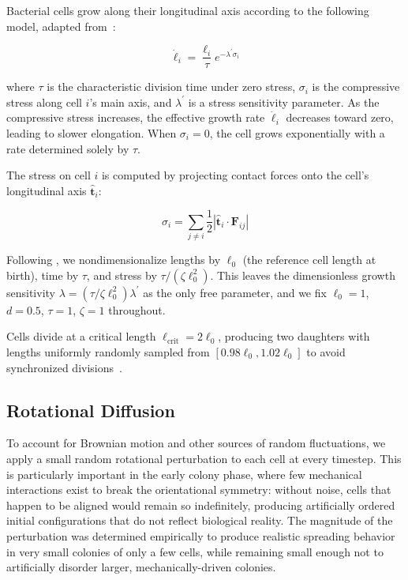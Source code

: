 \documentclass[a4paper,fleqn]{cas-dc}
\begin{document}
Bacterial cells grow along their longitudinal axis according to the following model, adapted from~\cite{Weady2024SM}:

\begin{equation} \label{eq:growth}
    \dot{\ell}_i = \frac{\ell_i}{\tau} e^{-\lambda^{'} \sigma_i}
\end{equation}

where $\tau$ is the characteristic division time under zero stress, $\sigma_i$ is the compressive stress along cell $i$'s main axis, and $\lambda^{'}$ is a stress sensitivity parameter. As the compressive stress increases, the effective growth rate $\dot{\ell}_i$ decreases toward zero, leading to slower elongation. When $\sigma_i = 0$, the cell grows exponentially with a rate determined solely by $\tau$.

The stress on cell $i$ is computed by projecting contact forces onto the cell's longitudinal axis $\hat{\mathbf{t}}_i$:

\begin{equation} \label{eq:stress}
    \sigma_i = \sum_{j \neq i} \frac{1}{2} \left| \hat{\mathbf{t}}_i \cdot \mathbf{F}_{ij} \right|
\end{equation}

Following \cite{Weady2024SM}, we nondimensionalize lengths by $\ell_0$ (the reference cell length at birth), time by $\tau$, and stress by $\tau / (\zeta \ell_0^2)$. This leaves the dimensionless growth sensitivity $\lambda = (\tau / \zeta \ell_0^2)\lambda^{'}$ as the only free parameter, and we fix $\ell_0 = 1$, $d = 0.5$, $\tau = 1$, $\zeta = 1$ throughout.

Cells divide at a critical length $\ell_{\text{crit}} = 2 \ell_0$, producing two daughters with lengths uniformly randomly sampled from $\left[0.98 \ell_0, 1.02 \ell_0 \right]$ to avoid synchronized divisions~\cite{You2018}.

\subsection{Rotational Diffusion}

To account for Brownian motion and other sources of random fluctuations, we apply a small random rotational perturbation to each cell at every timestep. This is particularly important in the early colony phase, where few mechanical interactions exist to break the orientational symmetry: without noise, cells that happen to be aligned would remain so indefinitely, producing artificially ordered initial configurations that do not reflect biological reality. The magnitude of the perturbation was determined empirically to produce realistic spreading behavior in very small colonies of only a few cells, while remaining small enough not to artificially disorder larger, mechanically-driven colonies.
\end{document}
